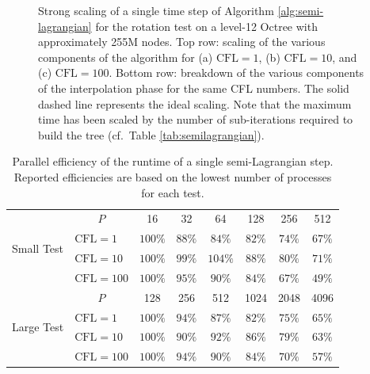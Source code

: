 \begin{figure}[htbp]
\begin{center}
	\end{center}
	\caption{Strong scaling of a single time step of Algorithm \ref{alg:semi-lagrangian} for the rotation test on a level-12 Octree with approximately 255M nodes. Top row: scaling of the various components of the algorithm for (a) $\text{CFL} = 1$, (b) $\text{CFL} = 10$, and (c) $\text{CFL} = 100$. Bottom row: breakdown of the various components of the interpolation phase for the same CFL numbers. The solid dashed line represents the ideal scaling. Note that the maximum time has been scaled by the number of sub-iterations required to build the tree (cf.\ Table \ref{tab:semilagrangian}).}
	\label{fig:semilagrangian_large}
\end{figure}

\begin{table}
\centering
	\begin{tabular}{|l|l|cccccc|}
	\hline
	\multirow{4}{*}{Small Test} & \multicolumn{1}{|c|}{$P$} & 16      & 32      & 64      & 128     & 256    & 512 \\
	\cline{2-8} 	                            
	                            & $\text{CFL} = 1$   & $100\%$ & $88\%$  & $84\%$  & $82\%$  & $74\%$ & $67\%$ \\
	                            & $\text{CFL} = 10$  & $100\%$ & $99\%$  & $104\%$ & $88\%$  & $80\%$ & $71\%$ \\ 	                            
	                            & $\text{CFL} = 100$ & $100\%$ & $95\%$  & $90\%$  & $84\%$  & $67\%$ & $49\%$ \\
	\hline
	\multirow{4}{*}{Large Test} & \multicolumn{1}{|c|}{$P$} & 128     & 256     & 512     & 1024    & 2048   & 4096 \\
	\cline{2-8} 	                            
	                            & $\text{CFL} = 1$   & $100\%$ & $94\%$  & $87\%$  & $82\%$  & $75\%$ & $65\%$ \\
	                            & $\text{CFL} = 10$  & $100\%$ & $90\%$  & $92\%$  & $86\%$  & $79\%$ & $63\%$ \\
	                            & $\text{CFL} = 100$ & $100\%$ & $94\%$  & $90\%$  & $84\%$  & $70\%$ & $57\%$ \\
	\hline
	\end{tabular}
	\caption{Parallel efficiency of the runtime of a single semi-Lagrangian step. Reported efficiencies are based on the lowest number of processes for each test.}
	\label{tab:scaling_semilagrangian}
\end{table}

